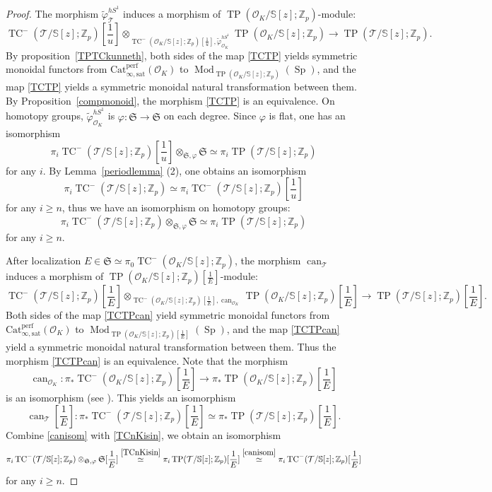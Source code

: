 \documentclass[11pt]{amsart}
\newcommand{\Z}{\mathbb{Z}}
\newcommand{\sO}{\mathcal{O}}
\newcommand{\sT}{\mathcal{T}}
\newcommand{\bS}{\mathbb{S}}
\newcommand{\Mod}{\operatorname{Mod}}
\newcommand{\TP}{\operatorname{TP}}
\newcommand{\TCn}{\operatorname{TC}^{-}}
\newcommand{\can}{\operatorname{can}}
\newcommand{\mS}{\mathfrak{S}}
\newcommand{\Catsat}{\operatorname{Cat_{\infty,sat}^{perf}}}
\newcommand{\Sp}{\operatorname{Sp}}
\theoremstyle{definition}
\theoremstyle{remark}
\numberwithin{equation}{section}
\begin{document}
\begin{proof}
The morphism $\tilde{\varphi}^{hS^1}_\sT$ induces a morphism of $\TP(\sO_K/\bS[z];\Z_p)$-module:
\begin{equation}\label{TCTP}
\TCn(\sT/\bS[z];\Z_p) [\frac{1}{u}]\otimes_{\TCn(\sO_K/\bS[z];\Z_p)[\frac{1}{u}],\tilde{\varphi}^{hS^1}_{\sO_K}} \TP(\sO_K/\bS[z];\Z_p) \to \TP(\sT/\bS[z];\Z_p).
\end{equation}
By proposition~\ref{TPTCkunneth}, both sides of the map \eqref{TCTP} yields symmetric monoidal functors from $\Catsat(\sO_K)$ to $\Mod_{\TP(\sO_K/\bS[z];\Z_p)}(\Sp)$, and the map \eqref{TCTP} yields a symmetric monoidal natural transformation between them. By Proposition~\ref{compmonoid}, the morphism \eqref{TCTP} is an equivalence. On homotopy groups, $\tilde{\varphi}^{hS^1}_{\sO_K}$ is $\varphi:\mS\to \mS$ on each degree. Since $\varphi$ is flat, one has an isomorphism
\begin{equation}\label{preTCnKisin}
\pi_i\TCn(\sT/\bS[z];\Z_p)[\frac{1}{u}] \otimes_{\mS,\varphi} \mS \simeq \pi_i \TP(\sT/\bS[z];\Z_p)
\end{equation}
for any $i$. By Lemma~\ref{periodlemma} (2), one obtains an isomorphism 
\[
\pi_i\TCn(\sT/\bS[z];\Z_p) \simeq \pi_i\TCn(\sT/\bS[z];\Z_p)[\frac{1}{u}] 
\]
for any $i \geq n$, thus we have an isomorphism on homotopy groups:
\begin{equation}\label{TCnKisin}
\pi_i\TCn(\sT/\bS[z];\Z_p) \otimes_{\mS,\varphi} \mS \simeq \pi_i \TP(\sT/\bS[z];\Z_p)
\end{equation}
for any $i \geq n$.

After localization $E\in \mS \simeq \pi_0 \TCn(\sO_K/\bS[z];\Z_p)$, the morphism $\can_\sT$ induces a morphism of $\TP(\sO_K/\bS[z];\Z_p)[\frac{1}{E}]$-module:
\begin{equation}\label{TCTPcan}
\TCn(\sT/\bS[z];\Z_p)[\frac{1}{E}] \otimes_{\TCn(\sO_K/\bS[z];\Z_p)[\frac{1}{E}],\can_{\sO_K}} \TP(\sO_K/\bS[z];\Z_p)[\frac{1}{E}] \to \TP(\sT/\bS[z];\Z_p)[\frac{1}{E}].
\end{equation}
Both sides of the map \eqref{TCTPcan} yield symmetric monoidal functors from $\Catsat(\sO_K)$ to $\Mod_{\TP(\sO_K/\bS[z];\Z_p)[\frac{1}{E}]}(\Sp)$, and the map \eqref{TCTPcan} yield a symmetric monoidal natural transformation between them. Thus the morphism \eqref{TCTPcan} is an equivalence. Note that the morphism 
\[
\can_{\sO_K}:\pi_*\TCn(\sO_K/\bS[z];\Z_p)[\frac{1}{E}] \to \pi_*\TP(\sO_K/\bS[z];\Z_p)[\frac{1}{E}]
\]
is an isomorphism (see \cite[Proposition 11.10]{BMS2}). This yields an isomorphism
\begin{equation}\label{canisom}
\can_{\sT}[\frac{1}{E}]:\pi_*\TCn(\sT/\bS[z];\Z_p)[\frac{1}{E}] \simeq \pi_*\TP(\sT/\bS[z];\Z_p)[\frac{1}{E}].
\end{equation}
Combine \eqref{canisom} with \eqref{TCnKisin}, we obtain an isomorphism
\[
\pi_i\TCn(\sT/\bS[z];\Z_p) \otimes_{\mS,\varphi} \mS [\frac{1}{E}]\overset{\eqref{TCnKisin}}{\simeq} \pi_i \TP(\sT/\bS[z];\Z_p)[\frac{1}{E}] \overset{\eqref{canisom}}{\simeq} \pi_i\TCn(\sT/\bS[z];\Z_p)[\frac{1}{E}] 
\]
for any $i \geq n$.
\end{proof} 
\end{document}
